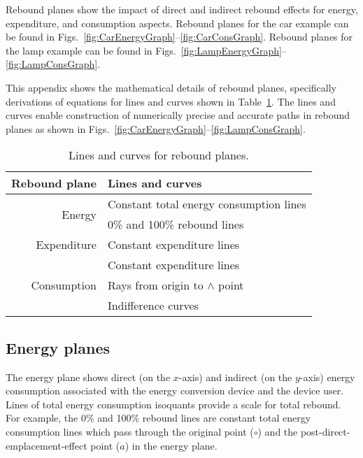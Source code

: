 
Rebound planes show the impact of direct and indirect rebound effects
for energy, expenditure, and consumption aspects.
Rebound planes for the car example can be found in 
Figs.~\ref{fig:CarEnergyGraph}--\ref{fig:CarConsGraph}.
Rebound planes for the lamp example can be found in
Figs.~\ref{fig:LampEnergyGraph}--\ref{fig:LampConsGraph}.

This appendix shows the mathematical details of rebound planes,
specifically derivations of equations for lines and curves 
shown in Table~\ref{tab:lines_and_curves}.
The lines and curves enable construction of numerically precise and accurate
paths in rebound planes
as shown in Figs.~\ref{fig:CarEnergyGraph}--\ref{fig:LampConsGraph}.

\begin{table}
\footnotesize
\centering
\caption{Lines and curves for rebound planes.}
\label{tab:lines_and_curves}
\begin{tabular}{rl}
\toprule
Rebound plane                & Lines and curves                        \\ 
\midrule
\multirow{2}{*}{Energy}      & Constant total energy consumption lines \\
                             & 0\% and 100\% rebound lines             \\
\midrule
Expenditure                  & Constant expenditure lines              \\
\midrule
\multirow{3}{*}{Consumption} & Constant expenditure lines              \\
                             & Rays from origin to $\wedge$ point      \\
                             & Indifference curves                     \\
\bottomrule
\end{tabular}
\end{table}


\subsection{Energy planes}
\label{sec:energy_path_graph_details}

The energy plane shows direct (on the $x$-axis) and indirect (on the $y$-axis)
energy consumption associated with the energy conversion device 
and the device user.
Lines of total energy consumption isoquants provide a 
scale for total rebound.
For example, the 0\% and 100\% rebound lines are constant total energy consumption
lines which pass through the original point ($\circ$) and
the post-direct-emplacement-effect point ($a$) 
in the energy plane.

